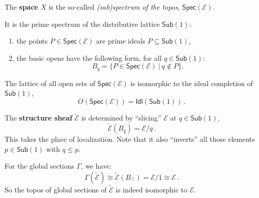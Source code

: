 \documentclass[11pt]{article}
\newcommand{\E}{\ensuremath{\mathcal{E}}}
\theoremstyle{remark}
\theoremstyle{definition}
\newcommand{\myemph}[1]{\textbf{#1}}
\begin{document}

The \myemph{space} $X$ is the so-called \emph{(sub)spectrum of the topos},  $\mathsf{Spec}(\E)$.\\  
\medskip

It is the prime spectrum of the distributive lattice $\mathsf{Sub}(1)$:
 \begin{enumerate}
\item the points $P\in \mathsf{Spec}(\E)$ are prime ideals $P\subseteq \mathsf{Sub}(1)$,
\item the basic opens have the following form, for all $q\in\mathsf{Sub}(1)$:
$$B_q = \{ P\in \mathsf{Spec}(\E)\ |\ q\not\in P \}.$$
\end{enumerate}

The lattice of all open sets of $\mathsf{Spec}(\E)$ is isomorphic to the ideal completion of $\mathsf{Sub}(1)$,
$$O(\mathsf{Spec}(\E)) = \mathsf{Idl}(\mathsf{Sub}(1))\,.$$

%



The \myemph{structure sheaf} $\tilde{\E}$ is determined by ``slicing'' $\E$ at $q \in\mathsf{Sub}(1)$,
\[
\tilde{\E}(B_q) = \E/q\,.
\]
This takes the place of localization.  Note that it also ``inverts'' all those elements $p\in \mathsf{Sub}(1)$ with $q\leq p$. 
\bigskip

For the global sections $\Gamma$, we have:
$$\Gamma(\tilde{\E}) \cong \tilde{\E}(B_\top) = \E/1 \cong \E\,.$$
So the topos of global sections of $\tilde{\E}$ is indeed  isomorphic to $\E$.
\end{document}
